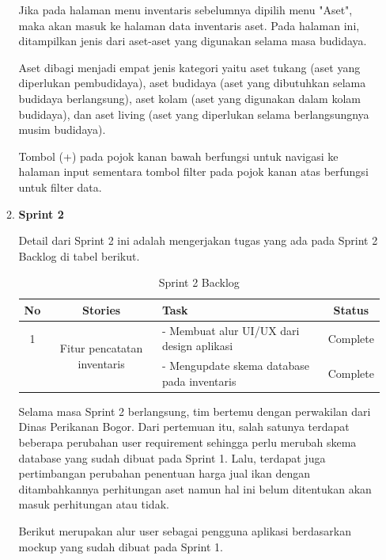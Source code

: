 \begin{enumerate}
\begin{enumerate}
		Jika pada halaman menu inventaris sebelumnya dipilih menu "Aset", maka akan masuk ke halaman data inventaris aset. Pada halaman ini, ditampilkan jenis dari aset-aset yang digunakan selama masa budidaya.
		
		Aset dibagi menjadi empat jenis kategori yaitu aset tukang (aset yang diperlukan pembudidaya), aset budidaya (aset yang dibutuhkan selama budidaya berlangsung), aset kolam (aset yang digunakan dalam kolam budidaya), dan aset living (aset yang diperlukan selama berlangsungnya musim budidaya).

		Tombol (+) pada pojok kanan bawah berfungsi untuk navigasi ke halaman input sementara tombol filter pada pojok kanan atas berfungsi untuk filter data.

		\item \textbf{Sprint 2}
		
		Detail dari Sprint 2 ini adalah mengerjakan tugas yang ada pada Sprint 2 Backlog di tabel berikut.
		
		\begin{table}[H]	
			\begin{center}
				\caption{Sprint 2 Backlog}
				\label{tab:table7}
				\begin{tabular}{|c|c|m{13em}|c|}
				\hline
				\textbf{No} & \textbf{Stories} & \textbf{Task} & \textbf{Status} \\
				\hline
				1 & \multirow{2}{10em}{Fitur pencatatan inventaris} & - Membuat alur UI/UX dari design aplikasi & Complete \\
				&  & - Mengupdate skema database pada inventaris & Complete \\ 
				\hline
				\end{tabular}
			\end{center}
		\end{table}

		Selama masa Sprint 2 berlangsung, tim bertemu dengan perwakilan dari Dinas Perikanan Bogor. Dari pertemuan itu, salah satunya terdapat beberapa perubahan user requirement sehingga perlu merubah skema database yang sudah dibuat pada Sprint 1. Lalu, terdapat juga pertimbangan perubahan penentuan harga jual ikan dengan ditambahkannya perhitungan aset namun hal ini belum ditentukan akan masuk perhitungan atau tidak. 

		Berikut merupakan alur user sebagai pengguna aplikasi berdasarkan mockup yang sudah dibuat pada Sprint 1.


\end{enumerate}
\end{enumerate}
